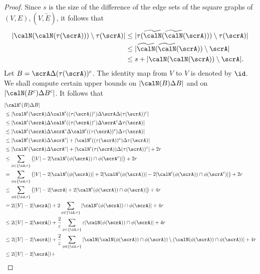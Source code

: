 \begin{proof}
Since $s$ is the size of the difference of the edge sets of the square graphs of $(V, E), (V, \widetilde E)$, it follows that 
\begin{align*}
|\calN(\calN(\tau(\scrA))) \setminus \tau(\scrA)|
& \leq 
 |\tau(\widetilde \calN(\widetilde \calN(\scrA))) \setminus \tau(\scrA)|\\
& \leq 
 |\widetilde \calN(\widetilde \calN(\scrA)) \setminus \scrA|\\
& \leq 
s+ | \calN(\calN(\scrA)) \setminus \scrA|.
\end{align*}
Let $B = \scrA\Delta(\tau(\scrA))^c$. The identity map from $V$ to $V$ is denoted by $\id$. We shall compute certain upper bounds on $|\calN(B) \Delta B|$ and on $|\calN(B^c) \Delta B^c|$. It follows that 
\begin{align*}
&|\calN^i(B) \Delta B| \\
& \leq |\calN^i(\scrA) \Delta \calN^i((\tau(\scrA))^c) \Delta \scrA \Delta(\tau(\scrA))^c| \\
& \leq |\calN^i(\scrA) \Delta \calN^i((\tau(\scrA))^c) \Delta \scrA^c \Delta \tau(\scrA)| \\
& \leq |\calN^i(\scrA) \Delta \scrA^c \Delta \calN^i((\tau(\scrA))^c) \Delta \tau(\scrA)| \\
& \leq |\calN^i(\scrA) \Delta \scrA^c| + |\calN^i((\tau(\scrA))^c) \Delta \tau(\scrA)|\\
& \leq |\calN^i(\scrA) \Delta \scrA^c| + |\calN^i(\tau(\scrA)) \Delta (\tau(\scrA))^c| + 2r\\
& \leq \sum_{\phi\in \{\id, \tau\}} \left( |V| - 2|\calN^i(\phi(\scrA)) \cap \phi(\scrA^c)|\right) + 2r\\
& = \sum_{\phi\in \{\id, \tau\}} \left( |V| - 2|\calN^i(\phi(\scrA))| + 2|\calN^i(\phi(\scrA))|  - 2|\calN^i(\phi(\scrA)) \cap \phi(\scrA^c)|\right) + 2r \\
& \leq \sum_{\phi\in \{\id, \tau\}} \left( |V| - 2|\scrA| + 2|\calN^i(\phi(\scrA)) \cap \phi(\scrA)|\right) + 4r \\
& = 2(|V| - 2|\scrA|) + 2\sum_{\phi\in \{\id, \tau\}} |\calN^i(\phi(\scrA)) \cap \phi(\scrA)| + 4r \\
& \leq 2(|V| - 2|\scrA|) + 
\frac 2\varepsilon\sum_{\phi\in \{\id, \tau\}} \varepsilon|\calN(\phi(\scrA)) \cap \phi(\scrA)| + 4r\\
& \leq 2(|V| - 2|\scrA|) + 
\frac 2\varepsilon\sum_{\phi\in \{\id, \tau\}} |\calN(\calN(\phi(\scrA)) \cap \phi(\scrA)) \setminus (\calN(\phi(\scrA)) \cap \phi(\scrA))| + 4r\\
& \leq 2(|V| - 2|\scrA|) + 

\end{align*}
\end{proof}
